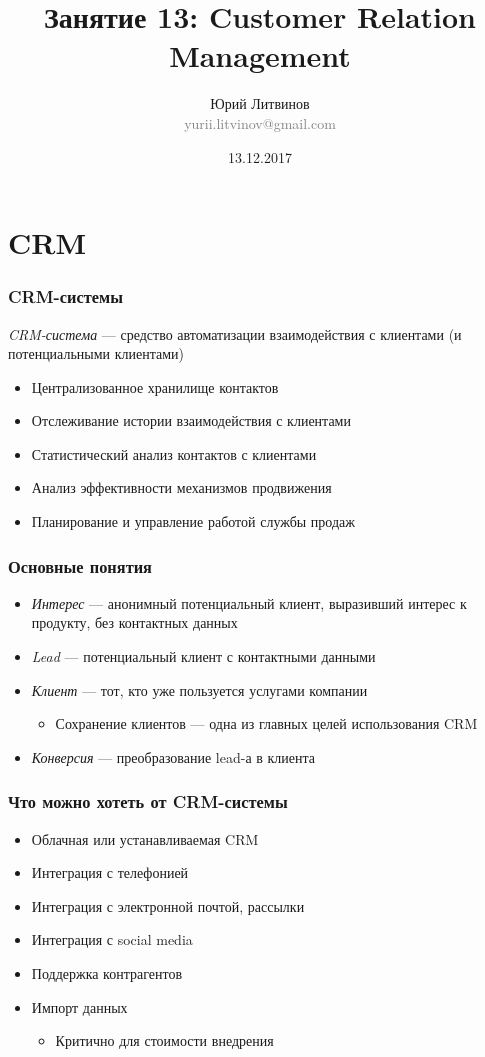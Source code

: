 \documentclass[xetex,mathserif,serif]{beamer}
\title{Занятие 13: Customer Relation Management}
\author[Юрий Литвинов]{Юрий Литвинов\\\small{\textcolor{gray}{yurii.litvinov@gmail.com}}}
\date{13.12.2017}
\begin{document}
	\frame{\titlepage}

	\section{CRM}

	\begin{frame}
		\frametitle{CRM-системы}
		\textit{CRM-система} --- средство автоматизации взаимодействия с клиентами (и потенциальными клиентами)
		\begin{itemize}
			\item Централизованное хранилище контактов
			\item Отслеживание истории взаимодействия с клиентами
			\item Статистический анализ контактов с клиентами
			\item Анализ эффективности механизмов продвижения
			\item Планирование и управление работой службы продаж
		\end{itemize}
	\end{frame}

	\begin{frame}
		\frametitle{Основные понятия}
		\begin{itemize}
			\item \textit{Интерес} --- анонимный потенциальный клиент, выразивший интерес к продукту, без контактных данных
			\item \textit{Lead} --- потенциальный клиент с контактными данными
			\item \textit{Клиент} --- тот, кто уже пользуется услугами компании
			\begin{itemize}
				\item Сохранение клиентов --- одна из главных целей использования CRM
			\end{itemize}
			\item \textit{Конверсия} --- преобразование lead-а в клиента
		\end{itemize}
	\end{frame}

	\begin{frame}
		\frametitle{Что можно хотеть от CRM-системы}
		\begin{itemize}
			\item Облачная или устанавливаемая CRM
			\item Интеграция с телефонией
			\item Интеграция с электронной почтой, рассылки
			\item Интеграция с social media
			\item Поддержка контрагентов
			\item Импорт данных
			\begin{itemize}
				\item Критично для стоимости внедрения
			\end{itemize}
		\end{itemize}
	\end{frame}
\end{document}
